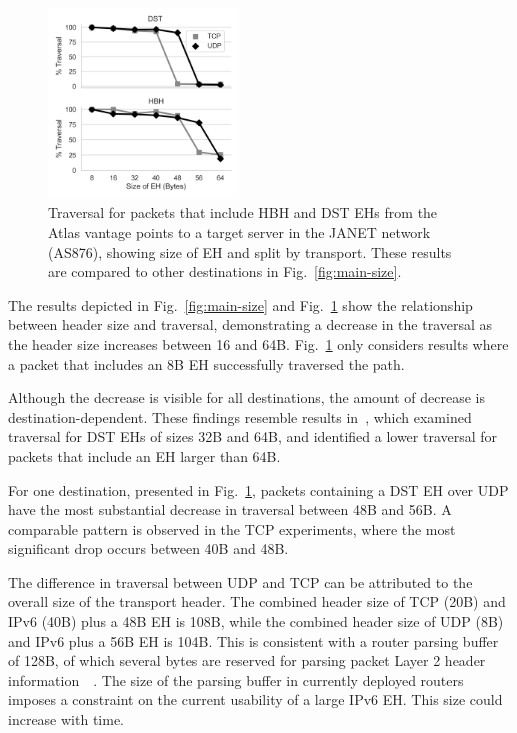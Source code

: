 \documentclass[conference]{IEEEtran}
\begin{document}
\begin{figure}[t]
\centering
  \includegraphics[width=0.45\textwidth]{sizes.png}
  \caption{Traversal for packets that include HBH and DST EHs from the Atlas
vantage points to a target server in the JANET network (AS876), showing
size of EH and split by transport. These results are compared to other destinations in Fig.~\ref{fig:main-size}.}

  \label{fig:sizes}
\end{figure}



The results depicted in Fig.~\ref{fig:main-size} and Fig.~\ref{fig:sizes} show the relationship between
header size and traversal, demonstrating a decrease in the traversal as the header size increases between 16 and 64B. 
Fig.~\ref{fig:sizes} only considers results where a packet that includes an 8B EH successfully traversed the path.

Although the decrease is visible for all destinations, the amount of decrease is destination-dependent. These findings
resemble results in~\cite{james-imc}, which examined traversal
 for DST EHs of sizes 32B and 64B, and identified a lower traversal for
packets that include an EH larger than 64B.

For one destination, presented in Fig.~\ref{fig:sizes}, packets containing a DST EH over UDP have the
most substantial decrease in traversal between 48B and 56B. A
comparable pattern is observed in the TCP experiments, where the most significant drop occurs between 40B and 48B. 


The difference in traversal between UDP and TCP can be attributed to the overall
size of the transport header.  The combined header size of TCP (20B) and IPv6
(40B) plus a 48B EH is 108B, while the combined header size of UDP (8B) and IPv6
plus a 56B EH is 104B. 
This is consistent with a router parsing buffer of 128B, of which several bytes are reserved for parsing packet Layer 2 header information~\cite{apnic-buffers}~\cite{ietf-6man-eh-limits-04}.
The size of the parsing buffer in currently deployed routers imposes a
constraint on the current usability of a large IPv6 EH. This size could increase with time.
\end{document}
